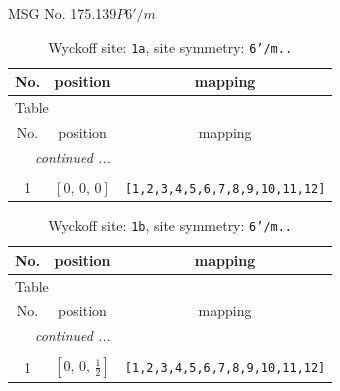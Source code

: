 \documentclass[fleqn,8pt]{jsarticle}
\begin{document}
\setcounter{MaxMatrixCols}{32}

\renewcommand{\tablename}{Table~}
\renewcommand{\figurename}{Figure~}
\begin{center}
\LARGE
MSG No. 175.139\quad$P6'/m$
\end{center}
\renewcommand{\arraystretch}{1.2}
\begin{longtable}{ccc}
\caption{Wyckoff site: {\tt 1a}, site symmetry: {\tt 6'/m..}}
 \\
 \hline \hline
No. & position & mapping \\ \hline \endfirsthead

\multicolumn{2}{l}{\tablename\ \thetable{}} \\
 \hline \hline
No. & position & mapping \\ \hline \endhead

 \hline \hline
\multicolumn{2}{r}{\footnotesize\it continued ...} \\ \endfoot

 \hline \hline
\multicolumn{2}{r}{} \\ \endlastfoot

1 & $\left[ 0,\, 0,\, 0 \right]$ & {\tt [1,2,3,4,5,6,7,8,9,10,11,12]} \\
\end{longtable}
\renewcommand{\arraystretch}{1.2}
\begin{longtable}{ccc}
\caption{Wyckoff site: {\tt 1b}, site symmetry: {\tt 6'/m..}}
 \\
 \hline \hline
No. & position & mapping \\ \hline \endfirsthead

\multicolumn{2}{l}{\tablename\ \thetable{}} \\
 \hline \hline
No. & position & mapping \\ \hline \endhead

 \hline \hline
\multicolumn{2}{r}{\footnotesize\it continued ...} \\ \endfoot

 \hline \hline
\multicolumn{2}{r}{} \\ \endlastfoot

1 & $\left[ 0,\, 0,\, \frac{1}{2} \right]$ & {\tt [1,2,3,4,5,6,7,8,9,10,11,12]} \\
\end{longtable}
\renewcommand{\arraystretch}{1.2}
\end{document}
